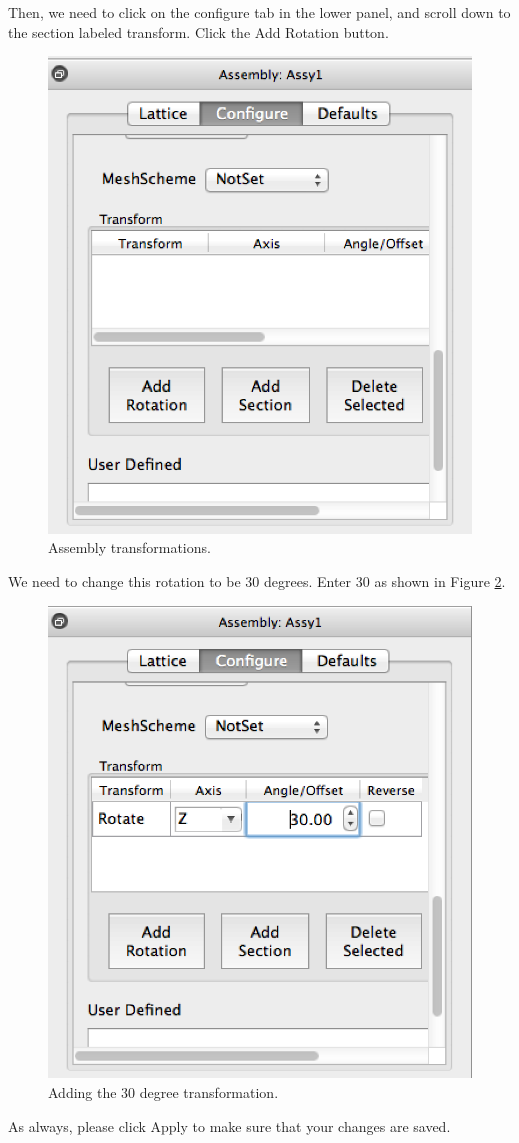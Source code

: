 Then, we need to click on the configure tab in the lower panel, and scroll down to the section labeled transform.  Click the Add Rotation button.

\begin{figure}[H]
	\begin{center}
		\includegraphics[width=0.5\linewidth]{Images/hex-rotation-area.png}
		\caption{Assembly transformations.}
		\label{fig:Hex16}
	\end{center}
\end{figure}

We need to change this rotation to be 30 degrees.  Enter 30 as shown in Figure \ref{fig:Hex17}.

\begin{figure}[H]
	\begin{center}
		\includegraphics[width=0.5\linewidth]{Images/hex-rotate-30.png}
		\caption{Adding the 30 degree transformation.}
		\label{fig:Hex17}
	\end{center}
\end{figure}

As always, please click Apply to make sure that your changes are saved.

